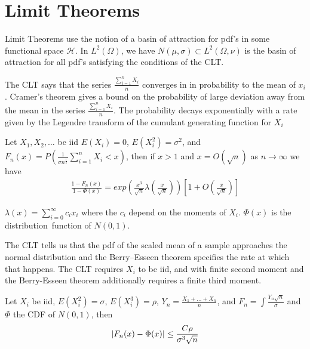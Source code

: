 \section*{Limit Theorems}
Limit Theorems use the notion of a basin of attraction for pdf's in some functional space $\mathcal{H}$. In $L^2(\Omega)$, we have $N(\mu,\sigma) \subset L^2(\Omega, \nu)$ is the basin of attraction for all pdf's satisfying the conditions of the CLT.

The CLT says that the series $\frac{\sum\limits_{i=1}^{n} X_i}{n}$ converges in in probability to the mean of $x_i$. Cramer's theorem gives a bound on the probability of large deviation away from the mean in the series $\frac{\sum\limits_{i=1}^{n} X_i}{n}$.  The probability decays exponentially with a rate given by the Legendre transform of the cumulant generating function for $X_i$
\begin{thm}
Let $X_1, X_2, \hdots $ be iid $E(X_i)=0$, $E(X_i^2)= \sigma^2$, and $F_n(x) = P(\frac{1}{\sigma n^{\frac{1}{2}}}  \sum\limits_{i=1}^{n} X_i < x)$, then if $x>1$ and $x=O(\sqrt{n})$ as  $n \rightarrow \infty$
we have
\begin{eqnarray*}
  \frac{1-F_n(x)}{1-\Phi(x)} = exp ( \frac{x^3}{\sqrt{n}} \lambda( \frac{x}{\sqrt{n}} )  ) [ 1 + O(\frac{x}{\sqrt{n}}) ]
\end{eqnarray*}

$\lambda(x) = \sum\limits_{i=0}^{\infty} c_i x_i$   where the $c_i$ depend on the moments of $X_i$.
$\Phi(x)$ is the distribution\ function of $N(0,1)$.
\end{thm}

\begin{thm}
\end{thm}

The CLT tells us that the pdf of the scaled mean of a sample approaches the normal distribution and the Berry–Esseen theorem specifies the rate at which that happens.  The CLT requires $X_i$ to be iid, and with finite second moment and the Berry-Esseen theorem additionally requires a finite third moment.
\begin{thm}
Let ${X_i}$ be iid, $E(X_i^2)=\sigma$, $E(X_i^3)=\rho$, $Y_n = \frac{X_1 + \ldots + X_n}{n}$, and $F_n = \int \frac{Y_n \sqrt{n} }{\sigma}$ and $\Phi$ the CDF of $N(0,1)$, then
\begin{equation}
\left\vert F_n(x) - \Phi(x)\right\vert \leq \frac{C \rho}{ \sigma^3 \sqrt{n} }
\end{equation}

\end{thm}

